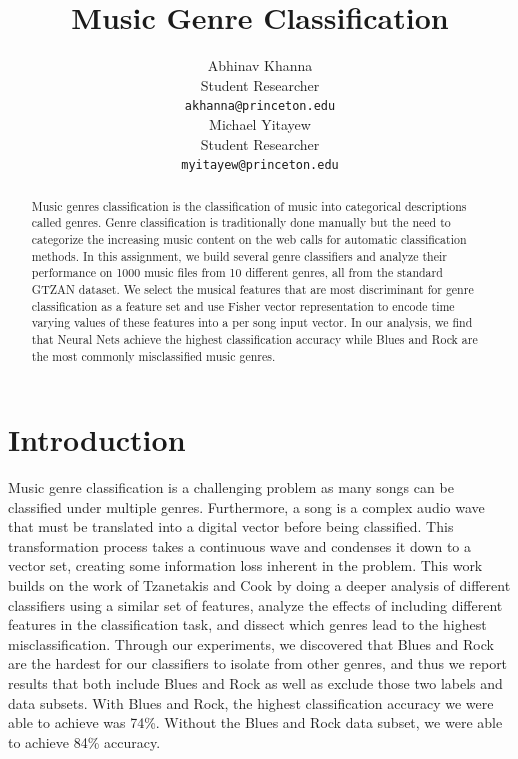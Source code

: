 \documentclass{article} %
\title{Music Genre Classification}
\author{
Abhinav Khanna\\
Student Researcher\\
\texttt{akhanna@princeton.edu} \\
\And
Michael Yitayew \\
Student Researcher \\
\texttt{myitayew@princeton.edu} \\
}
\begin{document}
\maketitle

\begin{abstract}
Music genres classification is the classification of music into categorical descriptions called genres. Genre classification is traditionally done manually but the need to categorize the increasing music content on the web calls for automatic classification methods. In this assignment, we build several genre classifiers and analyze their performance on 1000 music files from 10 different genres, all from the standard GTZAN dataset. We select the musical features that are most discriminant for genre classification as a feature set and use Fisher vector representation to encode time varying values of these features into a per song input vector. In our analysis, we find that Neural Nets achieve the highest classification accuracy while Blues and Rock are the most commonly misclassified music genres.
\end{abstract}

\section{Introduction}

Music genre classification is a challenging problem as many songs can be classified under multiple genres. Furthermore, a song is a complex audio wave that must be translated into a digital vector before being classified. This transformation process takes a continuous wave and condenses it down to a vector set, creating some information loss inherent in the problem. This work builds on the work of Tzanetakis and Cook by doing a deeper analysis of different classifiers using a similar set of features, analyze the effects of including different features in the classification task, and dissect which genres lead to the highest misclassification. Through our experiments, we discovered that Blues and Rock are the hardest for our classifiers to isolate from other genres, and thus we report results that both include Blues and Rock as well as exclude those two labels and data subsets. With Blues and Rock, the highest classification accuracy we were able to achieve was 74\%. Without the Blues and Rock data subset, we were able to achieve 84\% accuracy.
\end{document}

